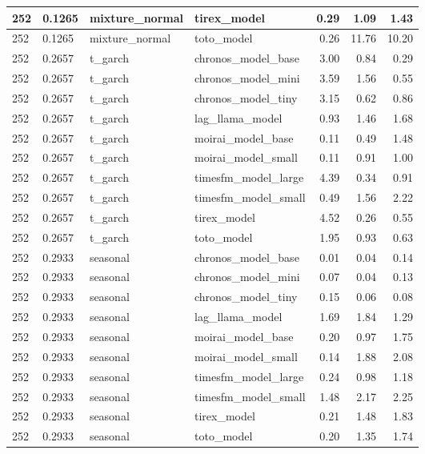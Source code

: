 {\begin{tabular}{llllrrr}
252 & 0.1265 & mixture\_normal & tirex\_model & 0.29 & 1.09 & 1.43 \\
\midrule
252 & 0.1265 & mixture\_normal & toto\_model & 0.26 & 11.76 & 10.20 \\
\midrule
252 & 0.2657 & t\_garch & chronos\_model\_base & 3.00 & 0.84 & 0.29 \\
\midrule
252 & 0.2657 & t\_garch & chronos\_model\_mini & 3.59 & 1.56 & 0.55 \\
\midrule
252 & 0.2657 & t\_garch & chronos\_model\_tiny & 3.15 & 0.62 & 0.86 \\
\midrule
252 & 0.2657 & t\_garch & lag\_llama\_model & 0.93 & 1.46 & 1.68 \\
\midrule
252 & 0.2657 & t\_garch & moirai\_model\_base & 0.11 & 0.49 & 1.48 \\
\midrule
252 & 0.2657 & t\_garch & moirai\_model\_small & 0.11 & 0.91 & 1.00 \\
\midrule
252 & 0.2657 & t\_garch & timesfm\_model\_large & 4.39 & 0.34 & 0.91 \\
\midrule
252 & 0.2657 & t\_garch & timesfm\_model\_small & 0.49 & 1.56 & 2.22 \\
\midrule
252 & 0.2657 & t\_garch & tirex\_model & 4.52 & 0.26 & 0.55 \\
\midrule
252 & 0.2657 & t\_garch & toto\_model & 1.95 & 0.93 & 0.63 \\
\midrule
252 & 0.2933 & seasonal & chronos\_model\_base & 0.01 & 0.04 & 0.14 \\
\midrule
252 & 0.2933 & seasonal & chronos\_model\_mini & 0.07 & 0.04 & 0.13 \\
\midrule
252 & 0.2933 & seasonal & chronos\_model\_tiny & 0.15 & 0.06 & 0.08 \\
\midrule
252 & 0.2933 & seasonal & lag\_llama\_model & 1.69 & 1.84 & 1.29 \\
\midrule
252 & 0.2933 & seasonal & moirai\_model\_base & 0.20 & 0.97 & 1.75 \\
\midrule
252 & 0.2933 & seasonal & moirai\_model\_small & 0.14 & 1.88 & 2.08 \\
\midrule
252 & 0.2933 & seasonal & timesfm\_model\_large & 0.24 & 0.98 & 1.18 \\
\midrule
252 & 0.2933 & seasonal & timesfm\_model\_small & 1.48 & 2.17 & 2.25 \\
\midrule
252 & 0.2933 & seasonal & tirex\_model & 0.21 & 1.48 & 1.83 \\
\midrule
252 & 0.2933 & seasonal & toto\_model & 0.20 & 1.35 & 1.74 \\
\midrule

\end{tabular}}
